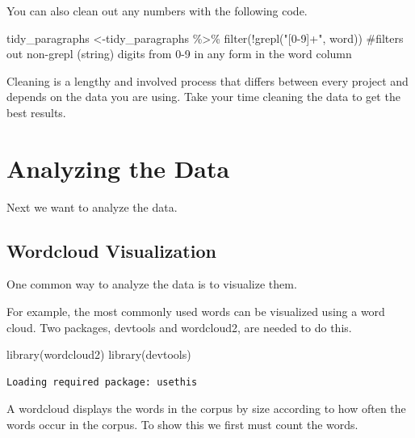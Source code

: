 \documentclass[
  letterpaper,
  DIV=11,
  numbers=noendperiod]{scrartcl}
\newenvironment{Shaded}{\begin{snugshade}}{\end{snugshade}}
\newcommand{\CommentTok}[1]{\textcolor[rgb]{0.37,0.37,0.37}{#1}}
\newcommand{\FunctionTok}[1]{\textcolor[rgb]{0.28,0.35,0.67}{#1}}
\newcommand{\NormalTok}[1]{\textcolor[rgb]{0.00,0.23,0.31}{#1}}
\newcommand{\OtherTok}[1]{\textcolor[rgb]{0.00,0.23,0.31}{#1}}
\newcommand{\SpecialCharTok}[1]{\textcolor[rgb]{0.37,0.37,0.37}{#1}}
\newcommand{\StringTok}[1]{\textcolor[rgb]{0.13,0.47,0.30}{#1}}
\begin{document}
You can also clean out any numbers with the following code.

\begin{Shaded}
\begin{Highlighting}[]
\NormalTok{tidy\_paragraphs }\OtherTok{\textless{}{-}}\NormalTok{tidy\_paragraphs }\SpecialCharTok{\%\textgreater{}\%}
          \FunctionTok{filter}\NormalTok{(}\SpecialCharTok{!}\FunctionTok{grepl}\NormalTok{(}\StringTok{"[0{-}9]+"}\NormalTok{, word)) }
\CommentTok{\#filters out non{-}grepl (string) digits from 0{-}9 in any form in the word column}
\end{Highlighting}
\end{Shaded}

Cleaning is a lengthy and involved process that differs between every
project and depends on the data you are using. Take your time cleaning
the data to get the best results.

\hypertarget{analyzing-the-data}{%
\section{Analyzing the Data}\label{analyzing-the-data}}

Next we want to analyze the data.

\hypertarget{wordcloud-visualization}{%
\subsection{Wordcloud Visualization}\label{wordcloud-visualization}}

One common way to analyze the data is to visualize them.

For example, the most commonly used words can be visualized using a word
cloud. Two packages, devtools and wordcloud2, are needed to do this.

\begin{Shaded}
\begin{Highlighting}[]
\FunctionTok{library}\NormalTok{(wordcloud2)}
\FunctionTok{library}\NormalTok{(devtools)}
\end{Highlighting}
\end{Shaded}

\begin{verbatim}
Loading required package: usethis
\end{verbatim}

A wordcloud displays the words in the corpus by size according to how
often the words occur in the corpus. To show this we first must count
the words.
\end{document}
